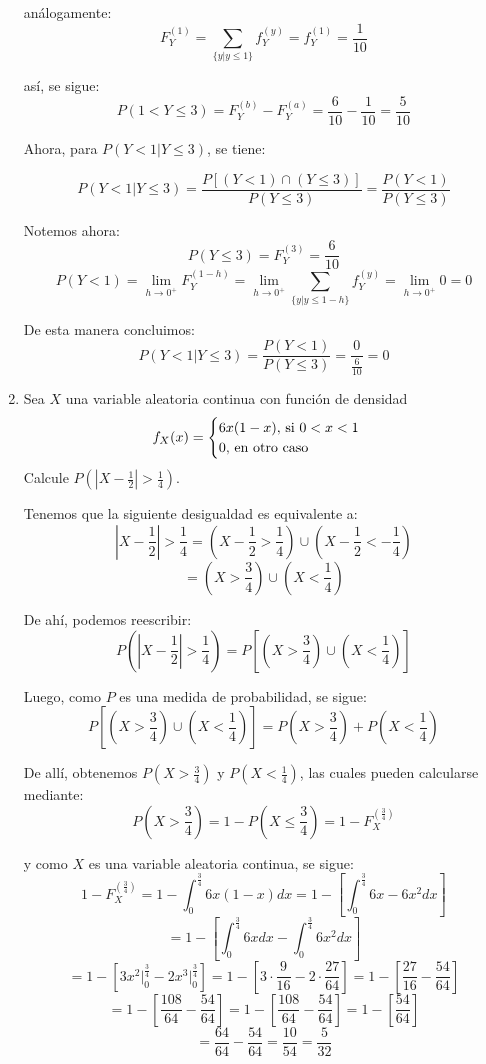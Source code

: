 \documentclass[12pt,a4paper]{report}
\begin{document}
\begin{enumerate}
{\begin{enumerate}
{						análogamente:
						$$ F_Y^{(1)} = \sum_{\{y | y \leq 1 \}} f_Y^{(y)}
						 = f_Y^{(1)} = \frac{1}{10}$$

						así, se sigue:
						$$ P(1 < Y \leq 3) = F_Y^{(b)} - F_Y^{(a)}
						 = \frac{6}{10} - \frac{1}{10} = \frac{5}{10}$$

						Ahora, para $P(Y < 1 | Y \leq 3)$, se tiene:

						$$ P(Y < 1 | Y \leq 3)
						 = \frac{P[(Y < 1) \cap (Y \leq 3)]}{P(Y \leq 3)}
						 = \frac{P(Y < 1)}{P(Y \leq 3)}$$

						Notemos ahora:
						$$ P(Y \leq 3) = F_Y^{(3)} = \frac{6}{10} $$
						$$ P(Y < 1) = \lim_{h\to 0^+} F_Y^{(1 - h)}
						 = \lim_{h\to 0^+} \sum_{\{y | y \leq 1 - h \}} f_Y^{(y)}
						 = \lim_{h\to 0^+} 0 = 0 $$

						De esta manera concluimos:
						$$ P(Y < 1 | Y \leq 3) = \frac{P(Y < 1)}{P(Y \leq 3)}
						 = \frac{0}{\frac{6}{10}} = 0 $$
					}
				\end{enumerate}
		}

		\item {
			Sea $X$ una variable aleatoria continua con función de densidad
				\[
					f_X(x) = \begin{cases}
										6x(1-x), $ si $ 0 < x < 1\\
										0, $ en otro caso$
									 \end{cases}
				\]
			Calcule $P(|X-\frac{1}{2}| > \frac{1}{4})$.

			Tenemos que la siguiente desigualdad es equivalente a:
			$$ |X-\frac{1}{2}| > \frac{1}{4}
			   = (X-\frac{1}{2} > \frac{1}{4}) \cup (X-\frac{1}{2} < -\frac{1}{4})$$
			$$ = (X > \frac{3}{4}) \cup (X < \frac{1}{4}) $$

			De ahí, podemos reescribir:
				$$ P(|X-\frac{1}{2}| > \frac{1}{4})
				 = P[(X > \frac{3}{4}) \cup (X < \frac{1}{4})]$$

			Luego, como $P$ es una medida de probabilidad, se sigue:
				$$ P[(X > \frac{3}{4}) \cup (X < \frac{1}{4})]
				 = P(X > \frac{3}{4}) + P(X < \frac{1}{4}) $$

			De allí, obtenemos $P(X > \frac{3}{4})$ y $P(X < \frac{1}{4})$, las cuales
			pueden calcularse mediante:
				$$ P(X > \frac{3}{4}) = 1 - P(X \leq \frac{3}{4})
				 = 1 - F_X^{(\frac{3}{4})} $$

			y como $X$ es una variable aleatoria continua, se sigue:
				$$ 1 - F_X^{(\frac{3}{4})} = 1 - \int_{0}^{\frac{3}{4}} 6x(1-x) dx
				   = 1 - [\int_{0}^{\frac{3}{4}} 6x - 6x^2 dx]  $$
				$$ = 1 - [\int_{0}^{\frac{3}{4}} 6x dx - \int_{0}^{\frac{3}{4}} 6x^2 dx ] $$
				$$ = 1 - [3 x^2 \Big|_0^\frac{3}{4} - 2 x^3 \Big|_0^\frac{3}{4}]
				   = 1 - [3 \cdot \frac{9}{16} - 2  \cdot \frac{27}{64} ]
				   = 1 - [\frac{27}{16} - \frac{54}{64} ] $$
				$$ = 1 - [\frac{108}{64} - \frac{54}{64} ]
				   = 1 - [\frac{108}{64} - \frac{54}{64} ]
				   = 1 - [\frac{54}{64}] $$
				$$ = \frac{64}{64} - \frac{54}{64}  = \frac{10}{54} = \frac{5}{32}$$

}
\end{enumerate}
\end{document}
